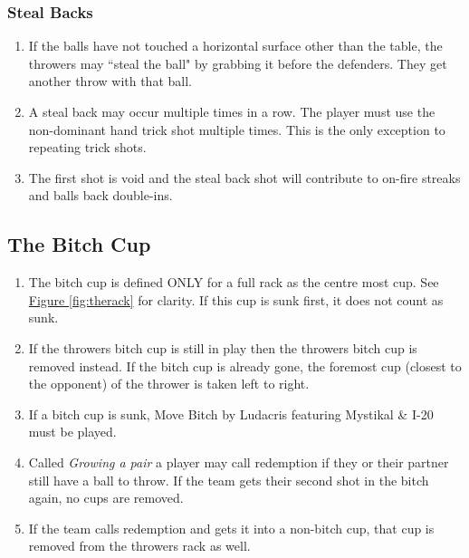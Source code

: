         \subsubsection{Steal Backs}\label{sssec:StealBacks}
        \begin{enumerate}[label=(\roman*), ref=\roman*]
            \item \label{itm:BallsBack,stealback} If the balls have not touched a horizontal surface other than the table, the throwers may ``steal the ball" by grabbing it before the defenders.
                They get another throw with that ball.
            \item \label{itm:BallsBack,stealback_multi} A steal back may occur multiple times in a row.
                The player must use the non-dominant hand trick shot multiple times. This is the only exception to repeating trick shots.
            \item \label{itm:BallsBack,stealback_redo} The first shot is void and the steal back shot will contribute to on-fire streaks and balls back double-ins.
        \end{enumerate}
	\subsection{The Bitch Cup}\label{ssec:BitchCup}
		\begin{enumerate}[label=(\roman*), ref=\roman*]
            \item \label{itm:BitchCup,def} The bitch cup is defined ONLY for a full rack as the centre most cup.
                See \hyperref[fig:therack]{Figure \ref*{fig:therack}} for clarity. If this cup is sunk first, it does not count as sunk.
            \item \label{itm:BitchCup,rem} If the throwers bitch cup is still in play then the throwers bitch cup is removed instead.
                If the bitch cup is already gone, the foremost cup (closest to the opponent) of the thrower is taken left to right.
            \item \label{itm:BitchCup,song} If a bitch cup is sunk, Move Bitch by Ludacris featuring Mystikal & I-20 must be played.
            \item \label{itm:BitchCup,redemption} Called \emph{Growing a pair} a player may call redemption if they or their partner still have a ball to throw.
                If the team gets their second shot in the bitch again, no cups are removed.
            \item \label{itm:BitchCup,redemptionFail} If the team calls redemption and gets it into a non-bitch cup, that cup is removed from the throwers rack as well.
        \end{enumerate}

